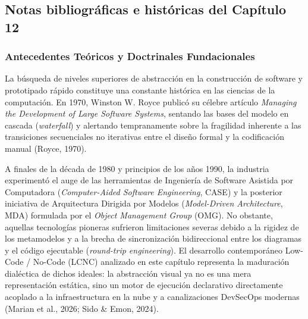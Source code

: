 \newpage
{}
\subsection*{Notas bibliográficas e históricas del Capítulo 12}

\subsubsection*{Antecedentes Teóricos y Doctrinales Fundacionales}

La búsqueda de niveles superiores de abstracción en la construcción de software y prototipado rápido constituye una constante histórica en las ciencias de la computación. En 1970, Winston W. Royce publicó su célebre artículo \textit{Managing the Development of Large Software Systems}, sentando las bases del modelo en cascada (\textit{waterfall}) y alertando tempranamente sobre la fragilidad inherente a las transiciones secuenciales no iterativas entre el diseño formal y la codificación manual (Royce, 1970). 

A finales de la década de 1980 y principios de los años 1990, la industria experimentó el auge de las herramientas de Ingeniería de Software Asistida por Computadora (\textit{Computer-Aided Software Engineering}, CASE) y la posterior iniciativa de Arquitectura Dirigida por Modelos (\textit{Model-Driven Architecture}, MDA) formulada por el \textit{Object Management Group} (OMG). No obstante, aquellas tecnologías pioneras sufrieron limitaciones severas debido a la rigidez de los metamodelos y a la brecha de sincronización bidireccional entre los diagramas y el código ejecutable (\textit{round-trip engineering}). El desarrollo contemporáneo Low-Code / No-Code (LCNC) analizado en este capítulo representa la maduración dialéctica de dichos ideales: la abstracción visual ya no es una mera representación estática, sino un motor de ejecución declarativo directamente acoplado a la infraestructura en la nube y a canalizaciones DevSecOps modernas (Marian et al., 2026; Sido \& Emon, 2024).

